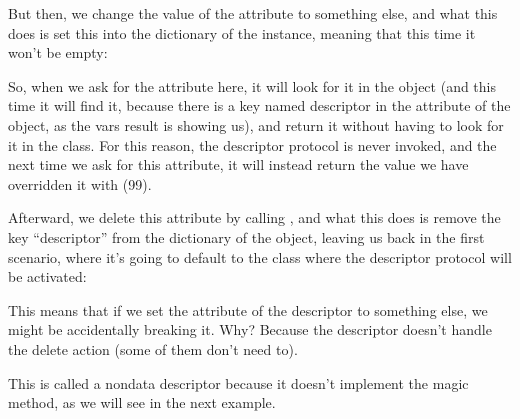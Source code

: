 \documentclass[a4paper,10pt,english]{sphinxmanual}
\begin{document}
But then, we change the value of the  attribute to something else, and what
this does is set this into the dictionary of the instance, meaning that this time it won’t be
empty:

\begin{sphinxVerbatim}[commandchars=\\\{\}]
  
\end{sphinxVerbatim}

So, when we ask for the  attribute here, it will look for it in the object (and
this time it will find it, because there is a key named descriptor in the  attribute
of the object, as the vars result is showing us), and return it without having to look for it in
the class. For this reason, the descriptor protocol is never invoked, and the next time we ask
for this attribute, it will instead return the value we have overridden it with (99).

Afterward, we delete this attribute by calling , and what this does is remove the key
“descriptor” from the dictionary of the object, leaving us back in the first scenario, where
it’s going to default to the class where the descriptor protocol will be activated:

\begin{sphinxVerbatim}[commandchars=\\\{\}]
 
\end{sphinxVerbatim}

This means that if we set the attribute of the descriptor to something else, we might be
accidentally breaking it. Why? Because the descriptor doesn’t handle the delete action
(some of them don’t need to).

This is called a non\sphinxhyphen{}data descriptor because it doesn’t implement the  magic
method, as we will see in the next example.
\end{document}
